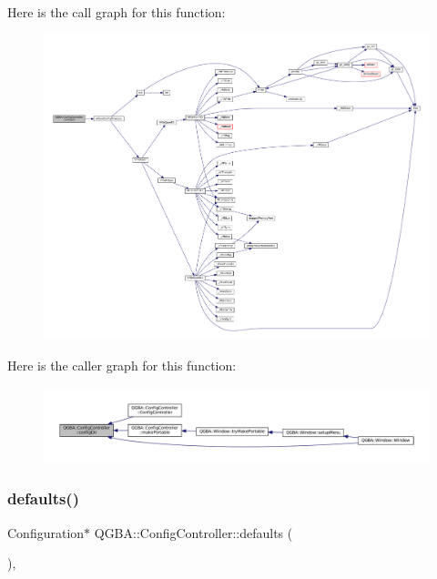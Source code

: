Here is the call graph for this function\+:
\nopagebreak
\begin{figure}[H]
\begin{center}
\leavevmode
\includegraphics[width=350pt]{class_q_g_b_a_1_1_config_controller_a853a8c4196e391ff95040f9c0f2fc0a0_cgraph}
\end{center}
\end{figure}
Here is the caller graph for this function\+:
\nopagebreak
\begin{figure}[H]
\begin{center}
\leavevmode
\includegraphics[width=350pt]{class_q_g_b_a_1_1_config_controller_a853a8c4196e391ff95040f9c0f2fc0a0_icgraph}
\end{center}
\end{figure}
\mbox{\label{class_q_g_b_a_1_1_config_controller_a9f6de53ccd9e22ae9ba11457f6c5a505}} 
\subsubsection{\texorpdfstring{defaults()}{defaults()}}
{\footnotesize\ttfamily Configuration$\ast$ Q\+G\+B\+A\+::\+Config\+Controller\+::defaults (\begin{DoxyParamCaption}{ }\end{DoxyParamCaption})\hspace{0.3cm}{\ttfamily [inline]}, {\ttfamily [private]}}

